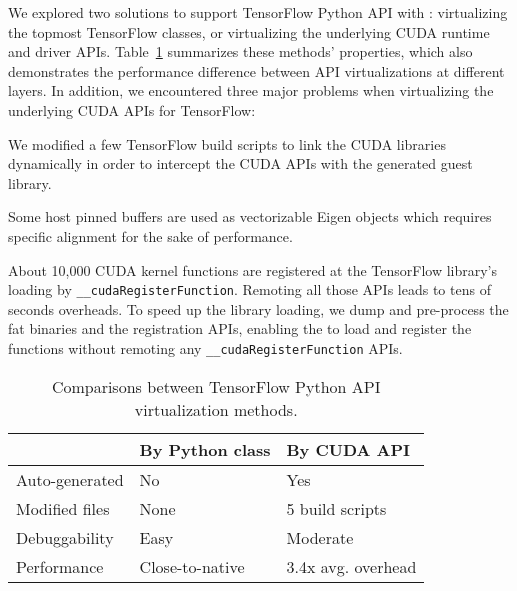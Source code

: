 We explored two solutions to support TensorFlow Python API with \model:
virtualizing the topmost TensorFlow classes,
or virtualizing the underlying CUDA runtime and driver APIs.
Table~\ref{tab:tensorflow_cmp} summarizes these methods' properties,
which also demonstrates the performance difference between API virtualizations at different layers.
In addition, we encountered three major problems when virtualizing the underlying CUDA APIs for TensorFlow:

We modified a few TensorFlow build scripts to link the CUDA libraries dynamically
in order to intercept the CUDA APIs with the generated guest library.

Some host pinned buffers are used as vectorizable Eigen objects which requires specific alignment for the sake of performance.

About 10,000 CUDA kernel functions are registered at the TensorFlow library's loading by \lstinline|__cudaRegisterFunction|.
Remoting all those APIs leads to tens of seconds overheads.
To speed up the library loading, we dump and pre-process the fat binaries and the registration APIs,
enabling the \worker to load and register the functions without remoting any \lstinline|__cudaRegisterFunction| APIs.

\begin{table}[!thp]
	\centering
	\begin{tabular}{l|l|l}
		& By Python class & By CUDA API \\ \hline
		Auto-generated & No   & Yes \\ \hline
		Modified files & None & 5 build scripts \\ \hline
		Debuggability  & Easy & Moderate \\ \hline
		Performance    & Close-to-native & 3.4x avg. overhead \\ \hline
	\end{tabular}
	\caption{Comparisons between TensorFlow Python API virtualization methods.}
	\label{tab:tensorflow_cmp}
\end{table}

